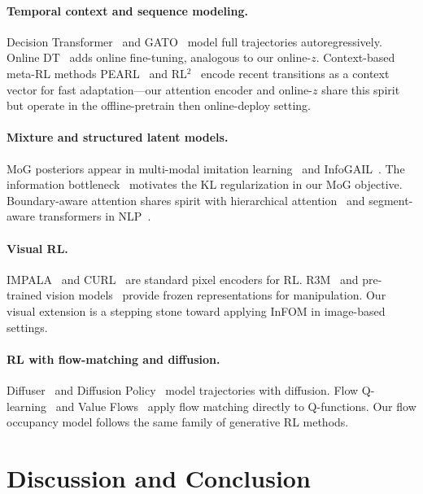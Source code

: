 \documentclass{article}
\newcommand{\base}{InFOM}
\begin{document}
\paragraph{Temporal context and sequence modeling.}
Decision Transformer~\cite{chen2021dt} and
GATO~\cite{reed2022gato} model full trajectories
autoregressively.
Online DT~\cite{zheng2022odt} adds online fine-tuning,
analogous to our online-$z$.
Context-based meta-RL methods
PEARL~\cite{rakelly2019pearl} and
RL$^2$~\cite{duan2016rl2}
encode recent transitions as a context vector for
fast adaptation—our attention encoder and online-$z$
share this spirit but operate in the offline-pretrain
then online-deploy setting.

\paragraph{Mixture and structured latent models.}
MoG posteriors appear in
multi-modal imitation learning~\cite{hausman2017multimodal}
and InfoGAIL~\cite{li2017infogail}.
The information bottleneck~\cite{tishby2000ib,alemi2017dvib}
motivates the KL regularization in our MoG objective.
Boundary-aware attention shares spirit with hierarchical
attention~\cite{yang2016hierarchical} and segment-aware
transformers in NLP~\cite{devlin2018bert}.

\paragraph{Visual RL.}
IMPALA~\cite{espeholt2018impala} and
CURL~\cite{laskin2020curl} are standard pixel encoders
for RL.
R3M~\cite{nair2023r3m} and pre-trained vision
models~\cite{parisi2022pretrained,xiao2022masked}
provide frozen representations for manipulation.
Our visual extension is a stepping stone toward applying
\base{} in image-based settings.

\paragraph{RL with flow-matching and diffusion.}
Diffuser~\cite{janner2022diffuser} and
Diffusion Policy~\cite{chi2023diffusionpolicy} model
trajectories with diffusion.
Flow Q-learning~\cite{park2025flowq} and
Value Flows~\cite{dong2025valueflows} apply flow matching
directly to Q-functions.
Our flow occupancy model follows the same family of
generative RL methods.

\section{Discussion and Conclusion}
\label{sec:conclusion}
\end{document}
